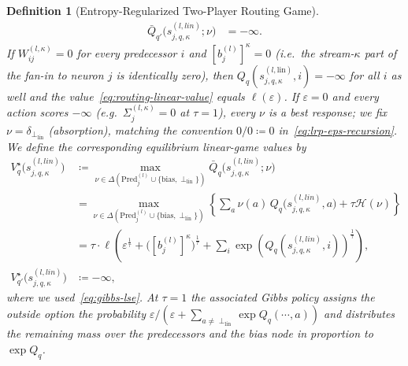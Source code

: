\documentclass[twoside]{article}
\newcommand{\1}{\mathbf{1}}
\newtheorem{definition}{Definition}
\begin{document}
\begin{definition}[Entropy-Regularized Two-Player Routing Game]
\begin{align}
    \bar Q_{q'} \bigl( s_{j,q,\kappa}^{(l, lin)};\nu \bigr)
    &= -\infty.
\end{align}
If $W_{ij}^{(l,\kappa)} = 0$ for every predecessor $i$ and $[b_j^{(l)}]^\kappa = 0$ (i.e.\ the
stream-$\kappa$ part of the fan-in to neuron $j$ is identically zero), then
$Q_q(s_{j,q,\kappa}^{(l,\mathrm{lin})},i) = -\infty$ for all $i$ as well and the
value~\eqref{eq:routing-linear-value} equals $\ell(\varepsilon)$. If $\varepsilon=0$ and every
action scores $-\infty$ (e.g.\ $\Sigma_j^{(l,\kappa)}=0$ at $\tau=1$), every $\nu$ is a best
response; we fix $\nu=\delta_{\perp_{\mathrm{lin}}}$ (absorption), matching the convention
$0/0\coloneqq0$ in~\eqref{eq:lrp-eps-recursion}.
We define the corresponding equilibrium linear-game values by
\begin{align}\label{eq:routing-linear-value}
    V^\star_q \bigl( s_{j,q,\kappa}^{(l, lin)} \bigr)
    &\coloneqq
    \max_{\nu \in \Delta(\mathrm{Pred}_j^{(l)} \cup \{\mathrm{bias}, \perp_{\mathrm{lin}}\})}
    \bar Q_q\bigl(s_{j,q,\kappa}^{(l, lin)};\nu\bigr) \nonumber \\
    &=
    \max_{\nu \in \Delta(\mathrm{Pred}_j^{(l)} \cup \{\mathrm{bias}, \perp_{\mathrm{lin}}\})}
    \left\{
    \sum_{a} \nu(a)\, Q_q \bigl( s_{j,q,\kappa}^{(l, lin)}, a \bigr)
    + \tau \mathcal{H}(\nu)
    \right\} \nonumber \\
    &=
    \tau \cdot \ell \left( \varepsilon^{ \frac{1}{\tau} } +
    \bigl([b_j^{(l)}]^\kappa\bigr)^{\frac{1}{\tau}} + \sum_i \exp\left( Q_q(s_{j,q,\kappa}^{(l, lin)},
    i) \right)^{ \frac{ 1 }{ \tau } } \right), \\
    V^\star_{q'} \bigl( s_{j,q,\kappa}^{(l, lin)} \bigr)
    &\coloneqq -\infty,
\end{align}
where we used~\eqref{eq:gibbs-lse}. At $\tau = 1$ the associated Gibbs policy assigns the outside
option the probability $\varepsilon / (\varepsilon + \sum_{a \neq \perp_{\mathrm{lin}}} \exp
    Q_q(\cdots, a))$ and distributes the remaining mass over the predecessors and the bias node in
proportion to $\exp Q_q$.


\end{definition}
\end{document}
